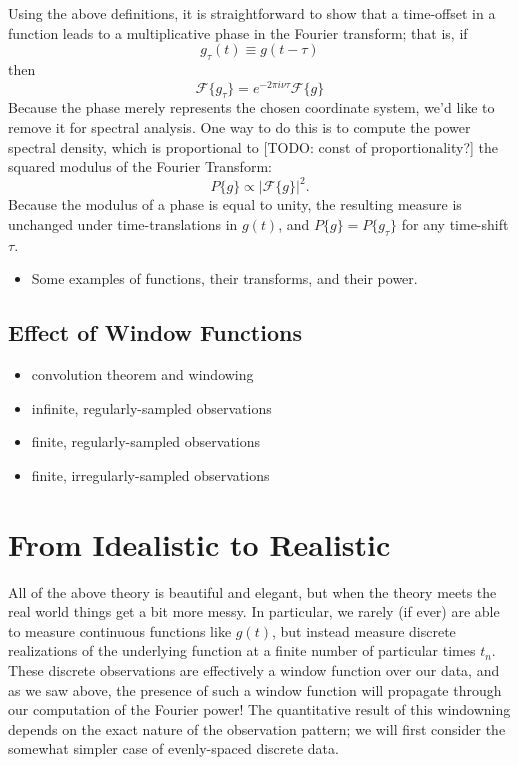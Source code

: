 \documentclass[preprint]{aastex}
\newcommand{\todo}[1]{{\color{red} [TODO: #1]}}
\begin{document}
Using the above definitions, it is straightforward to show that a time-offset in a function leads to a multiplicative phase in the Fourier transform; that is, if
\begin{equation}
  g_\tau(t) \equiv g(t - \tau)
\end{equation}
then
\begin{equation}
  \mathcal{F}\{g_\tau\} = e^{-2\pi i \nu \tau}\mathcal{F}\{g\}
\end{equation}
Because the phase merely represents the chosen coordinate system, we'd like to remove it for spectral analysis.
One way to do this is to compute the power spectral density, which is proportional to \todo{const of proportionality?} the squared modulus of the Fourier Transform:
\begin{equation}
  P\{g\} \propto \left| \mathcal{F}\{g\} \right|^2.
\end{equation}
Because the modulus of a phase is equal to unity, the resulting measure is unchanged under time-translations in $g(t)$, and $P\{g\} = P\{g_\tau\}$ for any time-shift $\tau$.

\begin{itemize}
\item Some examples of functions, their transforms, and their power.
\end{itemize}

\subsection{Effect of Window Functions}

\begin{itemize}
\item convolution theorem and windowing
\item infinite, regularly-sampled observations
\item finite, regularly-sampled observations
\item finite, irregularly-sampled observations
\end{itemize}

\section{From Idealistic to Realistic}

All of the above theory is beautiful and elegant, but when the theory meets the real world things get a bit more messy.
In particular, we rarely (if ever) are able to measure continuous functions like $g(t)$, but instead measure discrete realizations of the underlying function at a finite number of particular times $t_n$.
These discrete observations are effectively a window function over our data, and as we saw above, the presence of such a window function will propagate through our computation of the Fourier power!
The quantitative result of this windowning depends on the exact nature of the observation pattern; we will first consider the somewhat simpler case of evenly-spaced discrete data.
\end{document}
